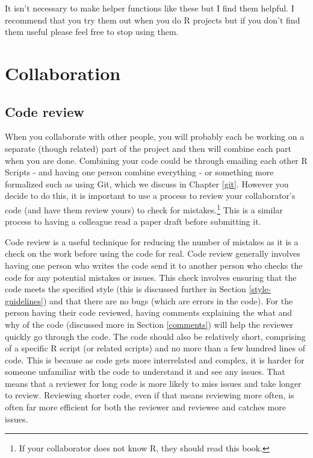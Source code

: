 \documentclass[
]{krantz}
\begin{document}
It isn't necessary to make helper functions like these but I
find them helpful. I recommend that you try them out when
you do R projects but if you don't find them useful please
feel free to stop using them.

\hypertarget{collaboration}{%
\chapter{Collaboration}\label{collaboration}}

\hypertarget{code-review}{%
\section{Code review}\label{code-review}}

When you collaborate with other people, you will probably
each be working on a separate (though related) part of the
project and then will combine each part when you are done.
Combining your code could be through emailing each other R
Scripts - and having one person combine everything - or
something more formalized such as using Git, which we
discuss in Chapter \ref{git}. However you decide to do this,
it is important to use a process to review your
collaborator's code (and have them review yours) to check
for mistakes.\footnote{If your collaborator does not know R,
  they should read this book.} This is a similar process to
having a colleague read a paper draft before submitting it.

Code review is a useful technique for reducing the number of
mistakes as it is a check on the work before using the code
for real. Code review generally involves having one person
who writes the code send it to another person who checks the
code for any potential mistakes or issues. This check
involves ensuring that the code meets the specified style
(this is discussed further in Section
\ref{style-guidelines}) and that there are no bugs (which
are errors in the code). For the person having their code
reviewed, having comments explaining the what and why of the
code (discussed more in Section \ref{comments}) will help
the reviewer quickly go through the code. The code should
also be relatively short, comprising of a specific R script
(or related scripts) and no more than a few hundred lines of
code. This is because as code gets more interrelated and
complex, it is harder for someone unfamiliar with the code
to understand it and see any issues. That means that a
reviewer for long code is more likely to miss issues and
take longer to review. Reviewing shorter code, even if that
means reviewing more often, is often far more efficient for
both the reviewer and reviewee and catches more issues.
\end{document}
